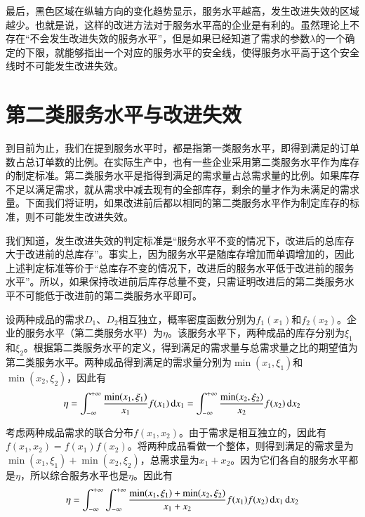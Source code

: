 最后，黑色区域在纵轴方向的变化趋势显示，服务水平越高，发生改进失效的区域越少。也就是说，这样的改进方法对于服务水平高的企业是有利的。虽然理论上不存在“不会发生改进失效的服务水平”，但是如果已经知道了需求的参数$\lambda$的一个确定的下限，就能够指出一个对应的服务水平的安全线，使得服务水平高于这个安全线时不可能发生改进失效。












\section{第二类服务水平与改进失效}

到目前为止，我们在提到服务水平时，都是指第一类服务水平，即得到满足的订单数占总订单数的比例。在实际生产中，也有一些企业采用第二类服务水平作为库存的制定标准。第二类服务水平是指得到满足的需求量占总需求量的比例。如果库存不足以满足需求，就从需求中减去现有的全部库存，剩余的量才作为未满足的需求量。下面我们将证明，如果改进前后都以相同的第二类服务水平作为制定库存的标准，则不可能发生改进失效。

我们知道，发生改进失效的判定标准是“服务水平不变的情况下，改进后的总库存大于改进前的总库存”。事实上，因为服务水平是随库存增加而单调增加的，因此上述判定标准等价于“总库存不变的情况下，改进后的服务水平低于改进前的服务水平”。所以，如果保持改进前后库存总量不变，只需证明改进后的第二类服务水平不可能低于改进前的第二类服务水平即可。

设两种成品的需求$D_1$、$D_2$相互独立，概率密度函数分别为$f_1(x_1)$和$f_2(x_2)$。企业的服务水平（第二类服务水平）为$\eta$。该服务水平下，两种成品的库存分别为$\xi_1$和$\xi_2$。根据第二类服务水平的定义，得到满足的需求量与总需求量之比的期望值为第二类服务水平。两种成品得到满足的需求量分别为$\min(x_1,\xi_1)$和$\min(x_2,\xi_2)$，因此有
\[
\eta = \int_{-\infty}^{+\infty}\frac{\min(x_1,\xi_1)}{x_1}f(x_1)\operatorname{d\!} x_1 = \int_{-\infty}^{+\infty}\frac{\min(x_2,\xi_2)}{x_2}f(x_2)\operatorname{d\!} x_2
\]

考虑两种成品需求的联合分布$f(x_1,x_2)$。由于需求是相互独立的，因此有$f(x_1,x_2)=f(x_1)f(x_2)$。将两种成品看做一个整体，则得到满足的需求量为$\min(x_1,\xi_1)+\min(x_2,\xi_2)$，总需求量为$x_1+x_2$。因为它们各自的服务水平都是$\eta$，所以综合服务水平也是$\eta$。因此有
\begin{equation}
\eta = \int_{-\infty}^{+\infty}\int_{-\infty}^{+\infty}\frac{\min(x_1,\xi_1)+\min(x_2,\xi_2)}{x_1+x_2}f(x_1)f(x_2)\operatorname{d\!} x_1 \operatorname{d\!} x_2
\label{eq:合并前第二类服务水平}
\end{equation}

